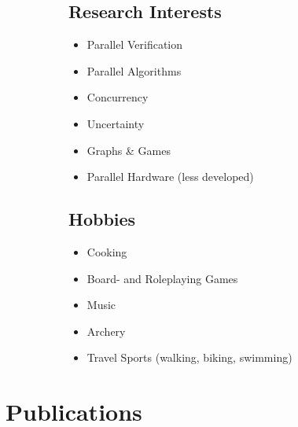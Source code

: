\documentclass[11pt]{article}
\begin{document}
\begin{figure}[h]
\begin{subfigure}[t]{0.5\textwidth}
			\subsection*{Research Interests}
			\begin{itemize}[noitemsep, nolistsep]
				\item Parallel Verification
				\item Parallel Algorithms
				\item Concurrency
				\item Uncertainty
				\item Graphs \& Games
				\item Parallel Hardware (less developed)
			\end{itemize}
		\end{subfigure}
		\begin{subfigure}[t]{0.5\textwidth}
			\subsection*{Hobbies}
			\begin{itemize}[noitemsep, nolistsep]
				\item Cooking
				\item Board- and Roleplaying Games
				\item Music
				\item Archery
				\item Travel Sports (walking, biking, swimming)
			\end{itemize}
		\end{subfigure}
	\end{figure}
	\section*{Publications}
	\nocite{*}
	
	
\end{document}
